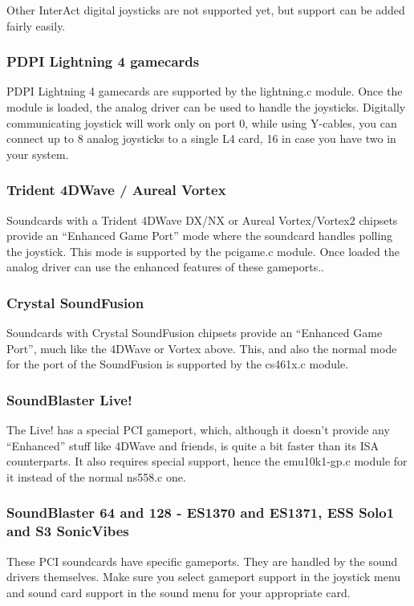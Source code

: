 \documentclass[a4paper,8pt,english]{sphinxmanual}
\begin{document}
Other InterAct digital joysticks are not supported yet, but support can be
added fairly easily.


\subsubsection{PDPI Lightning 4 gamecards}
\label{input/joydev/joystick:pdpi-lightning-4-gamecards}
PDPI Lightning 4 gamecards are supported by the lightning.c module.
Once the module is loaded, the analog driver can be used to handle the
joysticks. Digitally communicating joystick will work only on port 0, while
using Y-cables, you can connect up to 8 analog joysticks to a single L4
card, 16 in case you have two in your system.


\subsubsection{Trident 4DWave / Aureal Vortex}
\label{input/joydev/joystick:trident-4dwave-aureal-vortex}
Soundcards with a Trident 4DWave DX/NX or Aureal Vortex/Vortex2 chipsets
provide an ``Enhanced Game Port'' mode where the soundcard handles polling the
joystick.  This mode is supported by the pcigame.c module. Once loaded the
analog driver can use the enhanced features of these gameports..


\subsubsection{Crystal SoundFusion}
\label{input/joydev/joystick:crystal-soundfusion}
Soundcards with Crystal SoundFusion chipsets provide an ``Enhanced Game
Port'', much like the 4DWave or Vortex above. This, and also the normal mode
for the port of the SoundFusion is supported by the cs461x.c module.


\subsubsection{SoundBlaster Live!}
\label{input/joydev/joystick:soundblaster-live}
The Live! has a special PCI gameport, which, although it doesn't provide
any ``Enhanced'' stuff like 4DWave and friends, is quite a bit faster than
its ISA counterparts. It also requires special support, hence the
emu10k1-gp.c module for it instead of the normal ns558.c one.


\subsubsection{SoundBlaster 64 and 128 - ES1370 and ES1371, ESS Solo1 and S3 SonicVibes}
\label{input/joydev/joystick:soundblaster-64-and-128-es1370-and-es1371-ess-solo1-and-s3-sonicvibes}
These PCI soundcards have specific gameports. They are handled by the
sound drivers themselves. Make sure you select gameport support in the
joystick menu and sound card support in the sound menu for your appropriate
card.
\end{document}
